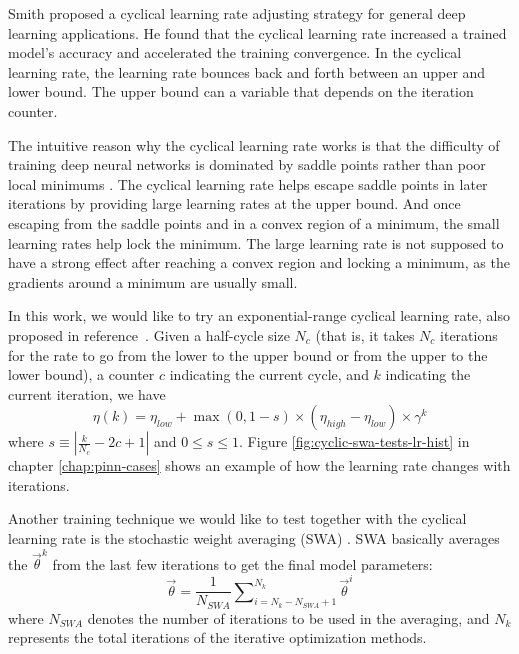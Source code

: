 Smith \cite{smith_cyclical_2017} proposed a cyclical learning rate adjusting strategy for general deep learning applications.
He found that the cyclical learning rate increased a trained model's accuracy and accelerated the training convergence.
In the cyclical learning rate, the learning rate bounces back and forth between an upper and lower bound.
The upper bound can a variable that depends on the iteration counter.

The intuitive reason why the cyclical learning rate works is that the difficulty of training deep neural networks is dominated by saddle points rather than poor local minimums \cite{dauphin_identifying_2014}.
The cyclical learning rate helps escape saddle points in later iterations by providing large learning rates at the upper bound.
And once escaping from the saddle points and in a convex region of a minimum, the small learning rates help lock the minimum.
The large learning rate is not supposed to have a strong effect after reaching a convex region and locking a minimum, as the gradients around a minimum are usually small.

In this work, we would like to try an exponential-range cyclical learning rate, also proposed in reference~\cite{smith_cyclical_2017}.
Given a half-cycle size $N_c$ (that is, it takes $N_c$ iterations for the rate to go from the lower to the upper bound or from the upper to the lower bound), a counter $c$ indicating the current cycle, and $k$ indicating the current iteration, we have
\begin{equation}\label{eq:cyclical-learning-rate}
    \eta(k) = \eta_{low} + \max(0, 1-s)\times(\eta_{high}-\eta_{low})\times\gamma^k
\end{equation}
where $s \equiv \left\lvert \frac{k}{N_c} - 2c + 1\right\rvert$ and $0 \le s \le 1$.
Figure \ref{fig:cyclic-swa-tests-lr-hist} in chapter \ref{chap:pinn-cases} shows an example of how the learning rate changes with iterations. 

Another training technique we would like to test together with the cyclical learning rate is the stochastic weight averaging (SWA) \cite{izmailov_averaging_2019}.
SWA basically averages the $\vec{\theta}^k$ from the last few iterations to get the final model parameters:
\begin{equation}
    \vec{\theta} = \frac{1}{N_{SWA}}\sum\nolimits_{i=N_k-N_{SWA}+1}^{N_k} \vec{\theta}^i
\end{equation}
where $N_{SWA}$ denotes the number of iterations to be used in the averaging, and $N_k$ represents the total iterations of the iterative optimization methods.

